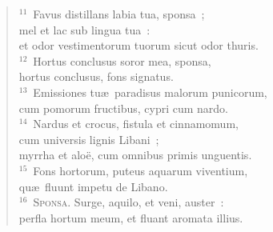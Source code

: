 \begin{flushleft}
\begin{verse}
${}^{11}$~Favus distillans labia tua, sponsa~;\\ mel et lac sub lingua tua~:\\ et odor vestimentorum tuorum sicut odor thuris.\\
${}^{12}$~Hortus conclusus soror mea, sponsa,\\ hortus conclusus, fons signatus.\\
${}^{13}$~Emissiones tu\ae\ paradisus malorum punicorum,\\ cum pomorum fructibus, cypri cum nardo.\\
${}^{14}$~Nardus et crocus, fistula et cinnamomum,\\ cum universis lignis Libani~;\\ myrrha et alo\"e, cum omnibus primis unguentis.\\
${}^{15}$~Fons hortorum, puteus aquarum viventium,\\ qu\ae\ fluunt impetu de Libano.\\
${}^{16}$~\textsc{Sponsa.} Surge, aquilo, et veni, auster~:\\ perfla hortum meum, et fluant aromata illius.\end{verse}\end{flushleft}


